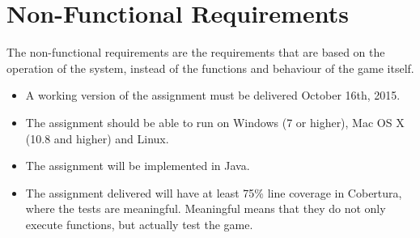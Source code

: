 \chapter{Non-Functional Requirements}

The non-functional requirements are the requirements that are based on the operation of the system, instead of the functions and behaviour of the game itself.

\begin{itemize}
\itemsep0em
	\item A working version of the assignment must be delivered October 16th, 2015.
	\item The assignment should be able to run on Windows (7 or higher), Mac OS X (10.8 and higher) and Linux.
	\item The assignment will be implemented in Java. 
	\item The assignment delivered will have at least 75\% line coverage in Cobertura, where the tests are meaningful. Meaningful means that they do not only execute functions, but actually test the game. 
\end{itemize}